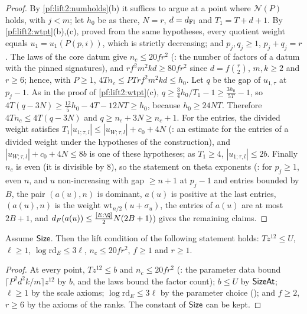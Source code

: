 \begin{proof}
By \cref{pf:lift2:numholds}(b) it suffices to argue at a point where $\mathcal N(P)$ holds, with $j<m$; let $h_0$ be as
there, $N=r$, $d=d_{\mathrm{Fl}}$ and $T_1=T+d+1$. By \cref{pf:lift2:wtpt}(b),(c), proved from the same hypotheses, every
quotient weight equals $u_1=u_1(P(p,i))$, which is strictly decreasing; and $p_j,q_j\ge1$, $p_j+q_j=r$. The laws of
the core datum give $n_c\le20fr^2$ (: the number of factors of a
datum with the pinned signatures), and $rf^2m^2kd\ge80fr^2$ since $d=f\binom r2$, $m,k\ge2$ and $r\ge6$; hence, with
$P\ge1$, $4Tn_c\le PTrf^2m^2kd\le h_0$. Let $q$ be the gap of $u_{1,\tau}$ at $p_j-1$. As in the proof of
\cref{pf:lift2:wtpt}(c), $q\ge\frac34h_0/T_1-1\ge\frac{3h_0}{5T}-1$, so $4T(q-3N)\ge\frac{12}5h_0-4T-12NT\ge h_0$, because
$h_0\ge24NT$. Therefore $4Tn_c\le4T(q-3N)$ and $q\ge n_c+3N\ge n_c+1$. For the entries, the divided weight satisfies
$T_1|u_{1;\tau,l}|\le|u_{W;\tau,l}|+c_0+4N$ (: an estimate for the
entries of a divided weight under the hypotheses of the construction), and $|u_{W;\tau,l}|+c_0+4N\le8b$ is one of
these hypotheses; as $T_1\ge4$, $|u_{1;\tau,l}|\le2b$. Finally $n_c$ is even (it is divisible by $8$), so the
statement on theta exponents (: for $p_j\ge1$,
even $n$, and $u$ non-increasing with gap $\ge n+1$ at $p_j-1$ and entries bounded by $B$, the pair $(a(u),n)$ is
dominant, $a(u)$ is positive at the last entries, $(a(u),n)$ is the weight $\mathrm{wt}_{n/2}(u+\sigma_u)$, the entries of
$a(u)$ are at most $2B+1$, and $d_F(a(u))\le\frac{[E:\Q]}2N(2B+1)$) gives the remaining claims.
\end{proof}

\begin{proposition}\label{pf:lift2:sizerel}
Assume $\mathsf{Size}$. Then the lift condition of the following statement holds: $Tz^{12}\le U$, $\ell\ge1$,
$\log\mathrm{rd}_E\le3\ell$, $n_c\le20fr^2$, $f\ge1$ and $r\ge1$.
\end{proposition}

\begin{proof}
At every point, $Tz^{12}\le b$ and $n_c\le20fr^2$ (: the parameter
data bound $\lceil P^2d^2k/m\rceil z^{12}$ by $b$, and the laws bound the factor count); $b\le U$ by
$\mathsf{SizeAt}$; $\ell\ge1$ by the scale axioms; $\log\mathrm{rd}_E\le3\ell$ by the parameter choice
(); and $f\ge2$, $r\ge6$ by the axioms of the ranks. The constant of
$\mathsf{Size}$ can be kept.
\end{proof}

